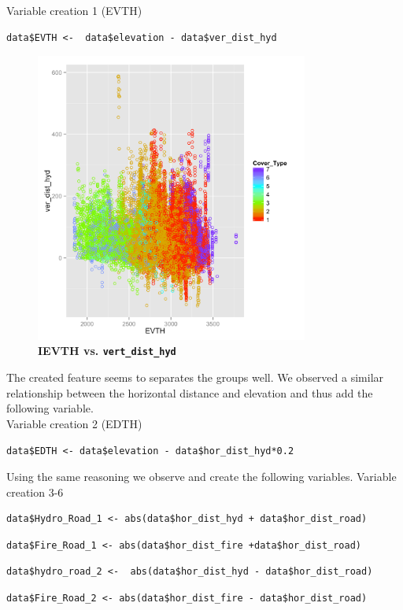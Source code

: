 \documentclass[paper=a4, fontsize=12pt]{scrartcl}
\numberwithin{equation}{section}
\numberwithin{figure}{section}
\numberwithin{table}{section}
\begin{document}
Variable creation 1 (EVTH)
\begin{lstlisting}
data$EVTH <-  data$elevation - data$ver_dist_hyd
\end{lstlisting}

\begin{figure}[H]
    \centering
    \includegraphics[width=0.8\textwidth]{EVTH_ver.png}
    \caption{ \textbf{IEVTH vs. \lstinline{vert_dist_hyd}}}
    \label{fig:errors}
\end{figure}

The created feature seems to separates the groups well. We observed a similar relationship between the horizontal distance and elevation and thus add the following variable.\\

Variable creation 2 (EDTH)\
\begin{lstlisting}
data$EDTH <- data$elevation - data$hor_dist_hyd*0.2
\end{lstlisting}
Using the same reasoning we observe and create the following variables.
Variable creation 3-6\
\begin{lstlisting}
data$Hydro_Road_1 <- abs(data$hor_dist_hyd + data$hor_dist_road)
\end{lstlisting}
\begin{lstlisting}
data$Fire_Road_1 <- abs(data$hor_dist_fire +data$hor_dist_road)
\end{lstlisting}
\begin{lstlisting}
data$hydro_road_2 <-  abs(data$hor_dist_hyd - data$hor_dist_road)
\end{lstlisting}
\begin{lstlisting}
data$Fire_Road_2 <- abs(data$hor_dist_fire - data$hor_dist_road)
\end{lstlisting}
\end{document}
